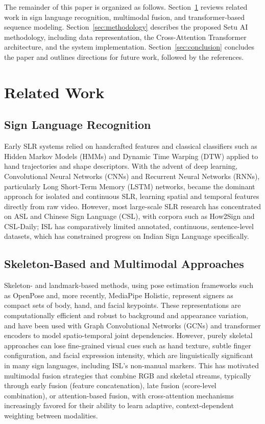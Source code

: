 \documentclass[pdflatex,sn-mathphys-num]{sn-jnl}
\begin{document}
The remainder of this paper is organized as follows. Section~\ref{sec:related} reviews related work in sign language recognition, multimodal fusion, and transformer-based sequence modeling. Section~\ref{sec:methodology} describes the proposed Setu AI methodology, including data representation, the Cross-Attention Transformer architecture, and the system implementation. Section~\ref{sec:conclusion} concludes the paper and outlines directions for future work, followed by the references.

\section{Related Work}\label{sec:related}

\subsection{Sign Language Recognition}
Early SLR systems relied on handcrafted features and classical classifiers such as Hidden Markov Models (HMMs) and Dynamic Time Warping (DTW) applied to hand trajectories and shape descriptors. With the advent of deep learning, Convolutional Neural Networks (CNNs) and Recurrent Neural Networks (RNNs), particularly Long Short-Term Memory (LSTM) networks, became the dominant approach for isolated and continuous SLR, learning spatial and temporal features directly from raw video. However, most large-scale SLR research has concentrated on ASL and Chinese Sign Language (CSL), with corpora such as How2Sign and CSL-Daily; ISL has comparatively limited annotated, continuous, sentence-level datasets, which has constrained progress on Indian Sign Language specifically.

\subsection{Skeleton-Based and Multimodal Approaches}
Skeleton- and landmark-based methods, using pose estimation frameworks such as OpenPose and, more recently, MediaPipe Holistic, represent signers as compact sets of body, hand, and facial keypoints. These representations are computationally efficient and robust to background and appearance variation, and have been used with Graph Convolutional Networks (GCNs) and transformer encoders to model spatio-temporal joint dependencies. However, purely skeletal approaches can lose fine-grained visual cues such as hand texture, subtle finger configuration, and facial expression intensity, which are linguistically significant in many sign languages, including ISL's non-manual markers. This has motivated multimodal fusion strategies that combine RGB and skeletal streams, typically through early fusion (feature concatenation), late fusion (score-level combination), or attention-based fusion, with cross-attention mechanisms increasingly favored for their ability to learn adaptive, context-dependent weighting between modalities.
\end{document}
